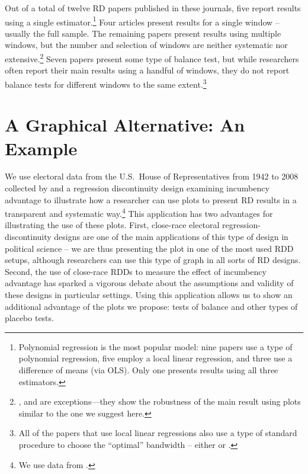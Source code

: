 \documentclass[letterpaper,twoside,12pt]{article}\usepackage[]{graphicx}\usepackage[]{color}
\begin{document}
Out of a total of twelve RD papers published in these journals, five report results using a single estimator.\footnote{Polynomial regression is the most popular model:  nine papers use a type of polynomial regression, five employ a local linear regression, and three use a difference of means (via OLS). Only one presents results using all three estimators.} Four articles present results for a single window -- usually the full sample. The remaining papers present results using multiple windows, but the number and selection of windows are neither systematic nor extensive.\footnote{\citet{gerber2011mayors}, \citet{ferwerda2014devolution} and \citet{eggers2015} are exceptions---they show the robustness of the main result using plots similar to the one we suggest here.} Seven papers present some type of balance test, but while researchers often report their main results using a handful of windows, they do not report balance tests for different windows to the same extent.\footnote{All of the papers that use local linear regressions also use a type of standard procedure to choose the ``optimal'' bandwidth -- either \citet{imbens2008regression} or \citet{imbens2011optimal}.}

\section*{A Graphical Alternative: An Example}

We use electoral data from the U.S.\ House of Representatives from 1942 to 2008 collected by \citet{caughey2011elections} and a regression discontinuity design examining incumbency advantage to illustrate how a researcher can use plots to present RD results in a transparent and systematic way.\footnote{We use data from \citet{caugheysekhondata}.} This application has two advantages for illustrating the use of these plots. First, close-race electoral regression-discontinuity designs are one of the main applications of this type of design in political science -- we are thus presenting the plot in one of the most used RDD setups, although researchers can use this type of graph in all sorts of RD designs. Second, the use of close-race RDDs to measure the effect of incumbency advantage has sparked a vigorous debate about the assumptions and validity of these designs in particular settings. Using this application allows us to show an additional advantage of the plots we propose: tests of balance and other types of placebo tests.
\end{document}
